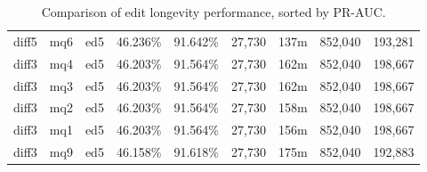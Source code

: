 \begin{sidewaystable}[!ph]
\begin{center}
\begin{tabular}{|c|c|c||c|c||c|c|c|c|}
diff5 & mq6 & ed5 & 46.236\% & 91.642\% & 27,730 & 137m & 852,040 & 193,281 \\
diff3 & mq4 & ed5 & 46.203\% & 91.564\% & 27,730 & 162m & 852,040 & 198,667 \\
diff3 & mq3 & ed5 & 46.203\% & 91.564\% & 27,730 & 162m & 852,040 & 198,667 \\
diff3 & mq2 & ed5 & 46.203\% & 91.564\% & 27,730 & 158m & 852,040 & 198,667 \\
diff3 & mq1 & ed5 & 46.203\% & 91.564\% & 27,730 & 156m & 852,040 & 198,667 \\
diff3 & mq9 & ed5 & 46.158\% & 91.618\% & 27,730 & 175m & 852,040 & 192,883 \\
\hline
\end{tabular}
\end{center}
\caption{Comparison of edit longevity performance,
    sorted by PR-AUC.}
\label{tab:editshoutB}
\end{sidewaystable}
\clearpage
